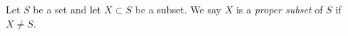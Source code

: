 \documentclass[12pt]{article}
\begin{document}
Let $S$ be a set and let $X \subset S$ be a subset. We say $X$ is a {\em proper subset} of $S$ if $X \neq S$.
\end{document}
